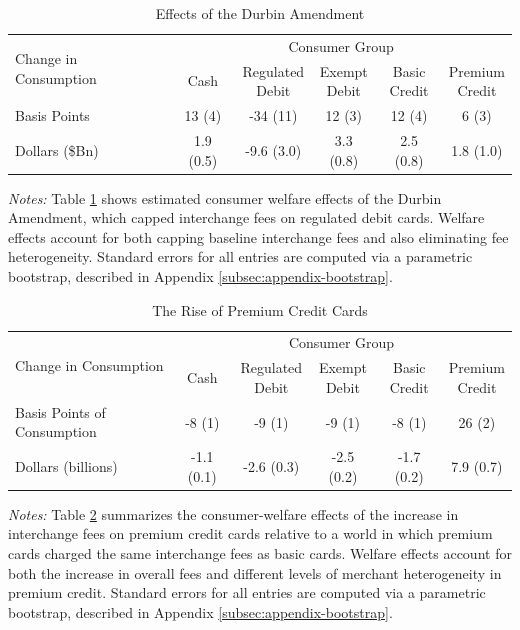 \documentclass[11pt,english]{article}
\theoremstyle{remark}
\begin{document}
\clearpage

\begin{table}[H]
  \centering
  \caption{Effects of the Durbin Amendment}
  \label{tab:durbin}

  \begin{tabular}{lccccc}
\toprule
\multirow{2}{*}{Change in Consumption} & \multicolumn{5}{c}{Consumer Group} \\
& Cash & \makecell{Regulated \\ Debit} & \makecell{Exempt \\ Debit}  & \makecell{Basic \\ Credit}  & \makecell{Premium \\ Credit} \\
\midrule
Basis Points & 13 (4) & -34 (11) & 12 (3) & 12 (4) & 6 (3) \\
Dollars (\$Bn) & 1.9 (0.5) & -9.6 (3.0) & 3.3 (0.8) & 2.5 (0.8) & 1.8 (1.0) \\
\bottomrule
\end{tabular}
 
  \par\textit{Notes:} Table \ref{tab:durbin} shows estimated consumer welfare effects of the Durbin Amendment, which capped interchange fees on regulated debit cards. Welfare effects account for both capping baseline interchange fees and also eliminating fee heterogeneity. Standard errors for all entries are computed via a parametric bootstrap, described in Appendix \ref{subsec:appendix-bootstrap}.
\end{table}

\clearpage

\begin{table}[H]
  \centering
  \caption{The Rise of Premium Credit Cards}
  \label{tab:premiumization}

  \begin{tabular}{lccccc}
\toprule
\multirow{2}{*}{Change in Consumption} & \multicolumn{5}{c}{Consumer Group} \\
& Cash & \makecell{Regulated \\ Debit} & \makecell{Exempt \\ Debit}  & \makecell{Basic \\ Credit}  & \makecell{Premium \\ Credit} \\
\midrule
Basis Points of Consumption & -8 (1) & -9 (1) & -9 (1) & -8 (1) & 26 (2) \\
Dollars (billions) & -1.1 (0.1) & -2.6 (0.3) & -2.5 (0.2) & -1.7 (0.2) & 7.9 (0.7) \\
\bottomrule
\end{tabular}
 
  \par\textit{Notes:} Table \ref{tab:premiumization} summarizes the consumer-welfare effects of the increase in interchange fees on premium credit cards relative to a world in which premium cards charged the same interchange fees as basic cards. Welfare effects account for both the increase in overall fees and different levels of merchant heterogeneity in premium credit. Standard errors for all entries are computed via a parametric bootstrap, described in Appendix \ref{subsec:appendix-bootstrap}.
\end{table}
\end{document}
